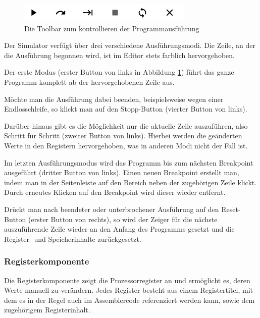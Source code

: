 \begin{figure}[ht]
	\centering
  \includegraphics[scale=1]{Images/Toolbar}
	\caption{Die Toolbar zum kontrollieren der Programmausführung}
	\label{Toolbar}
\end{figure}

Der Simulator verfügt über drei verschiedene Ausführungsmodi. Die Zeile, an der
die Ausführung begonnen wird, ist im Editor stets farblich hervorgehoben.

Der erste Modus (erster Button von links in Abbildung \ref{Toolbar}) führt das
ganze Programm komplett ab der hervorgehobenen Zeile aus.

Möchte man die Ausführung dabei beenden, beispielsweise wegen einer
Endlosschleife, so klickt man auf den Stopp-Button (vierter Button von links).

Darüber hinaus gibt es die Möglichkeit nur die aktuelle Zeile auszuführen, also
Schritt für Schritt (zweiter Button von links). Hierbei werden die geänderten
Werte in den Registern hervorgehoben, was in anderen Modi nicht der Fall ist.

Im letzten Ausführungsmodus wird das Programm bis zum nächsten Breakpoint
ausgeführt (dritter Button von links). Einen neuen Breakpoint erstellt man,
indem man in der Seitenleiste auf den Bereich neben der zugehörigen Zeile
klickt. Durch erneutes Klicken auf den Breakpoint wird dieser wieder entfernt.


Drückt man nach beendeter oder unterbrochener Ausführung auf den Reset-Button (erster
Button von rechts), so wird der Zeiger für die nächste auszuführende Zeile wieder
an den Anfang des Programms gesetzt und die Register- und Speicherinhalte zurückgesetzt.


\subsubsection{Registerkomponente}
Die Registerkomponente zeigt die
Prozessorregister an und ermöglicht es, deren Werte manuell zu verändern. Jedes
Register besteht aus einem Registertitel, mit dem es in der Regel auch im
Assemblercode referenziert werden kann, sowie dem zugehörigem Registerinhalt.

